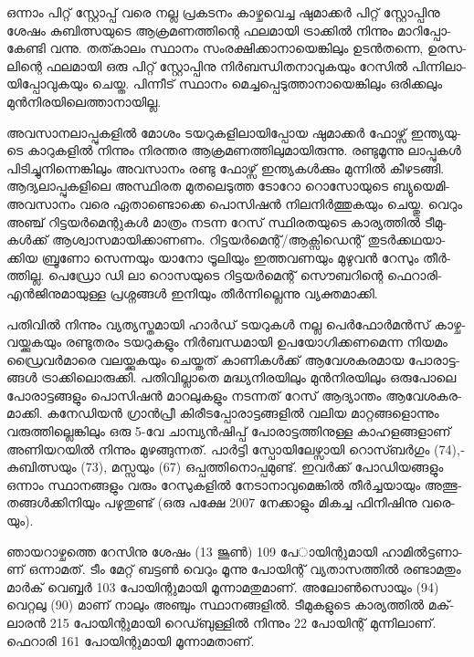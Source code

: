 ഒ­ന്നാം പി­റ്റ് സ്റ്റോ­പ്പ് വരെ നല്ല പ്ര­ക­ട­നം കാ­ഴ്ച­വെ­ച്ച ഷു­മാ­ക്കര്‍ പി­റ്റ് സ്റ്റോ­പ്പി­നു ശേ­ഷം കു­ബി­ത്സ­യു­ടെ ആക്ര­മ­ണ­ത്തി­ന്റെ 
ഫല­മാ­യി ട്രാ­ക്കില്‍ നി­ന്നും മാ­റി­പ്പോ­കേ­ണ്ടി വന്നു. തത്കാ­ലം സ്ഥാ­നം സം­ര­ക്ഷി­ക്കാ­നാ­യെ­ങ്കി­ലും ഉടന്‍­ത­ന്നെ, 
ഉര­സ­ലി­ന്റെ ഫല­മാ­യി ഒരു പി­റ്റ് സ്റ്റോ­പ്പി­നു നിര്‍­ബ­ന്ധി­ത­നാ­വു­ക­യും റേ­സില്‍ പി­ന്നി­ലാ­യി­പ്പോ­വു­ക­യും ചെ­യ്ത. പി­ന്നീ­ട് 
സ്ഥാ­നം മെ­ച്ച­പ്പെ­ടു­ത്താ­നാ­യെ­ങ്കി­ലും ഒരി­ക്ക­ലും മുന്‍­നി­ര­യി­ലെ­ത്താ­നാ­യി­ല്ല.

അ­വ­സാ­ന­ലാ­പ്പു­ക­ളില്‍ മോ­ശം ടയ­റു­ക­ളി­ലാ­യി­പ്പോയ ഷു­മാ­ക്കര്‍ ഫോ­ഴ്സ് ഇന്ത്യ­യു­ടെ കാ­റു­ക­ളില്‍ നി­ന്നും നി­ര­ന്തര 
ആക്ര­മ­ണ­ത്തി­ലു­മാ­യി­രു­ന്നു. രണ്ടു­മൂ­ന്നു ലാ­പ്പു­കള്‍ പി­ടി­ച്ചു­നി­ന്നെ­ങ്കി­ലും അവ­സാ­നം രണ്ടു ഫോ­ഴ്സ് ഇന്ത്യ­കള്‍­ക്കും മു­ന്നില്‍ 
കീ­ഴ­ട­ങ്ങി. ആദ്യ­ലാ­പ്പു­ക­ളി­ലെ അസ്ഥി­രത മു­ത­ലെ­ടു­ത്ത ടോ­റോ റൊ­സോ­യു­ടെ ­ബ്യു­യെ­മി­ അവ­സാ­നം വരെ 
ഏതാ­ണ്ടൊ­ക്കെ പൊ­സി­ഷന്‍ നി­ല­നിര്‍­ത്തു­ക­യും ചെ­യ്തു. വെ­റും അഞ്ച് റി­ട്ട­യര്‍­മെ­ന്റു­കള്‍ മാ­ത്രം നട­ന്ന റേ­സ് 
സ്ഥി­ര­ത­യു­ടെ കാ­ര്യ­ത്തില്‍ ടീ­മു­കള്‍­ക്ക് ആശ്വാ­സ­മാ­യി­ക്കാ­ണ­ണം. റി­ട്ട­യര്‍­മെ­ന്റ്/ആ­ക്സി­ഡെ­ന്റ് തു­ടര്‍­ക്ക­ഥ­യാ­ക്കിയ 
ബ്രൂ­ണോ സെ­ന്ന­യും യാ­നോ ട്രൂ­ലി­യും ഇത്ത­വ­ണ­യും മു­ഴു­വന്‍ റേ­സും തീര്‍­ത്തി­ല്ല. പെ­ഡ്രോ ഡി ലാ റൊ­സ­യു­ടെ 
റി­ട്ട­യര്‍­മെ­ന്റ് സൌ­ബ­റി­ന്റെ ­ഫെ­റാ­രി­ എന്‍­ജി­നു­മാ­യു­ള്ള പ്ര­ശ്ന­ങ്ങള്‍ ഇനി­യും തീര്‍­ന്നി­ല്ലെ­ന്നു വ്യ­ക്ത­മാ­ക്കി­.

­പ­തി­വില്‍ നി­ന്നും വ്യ­ത്യ­സ്ത­മാ­യി ഹാര്‍­ഡ് ടയ­റു­കള്‍ നല്ല പെര്‍­ഫോര്‍­മന്‍­സ് കാ­ഴ്ച­വ­യ്ക്കു­ക­യും രണ്ടു­ത­രം ടയ­റു­ക­ളും 
നിര്‍­ബ­ന്ധ­മാ­യി ഉപ­യോ­ഗി­ക്ക­ണ­മെ­ന്ന നി­യ­മം ഡ്രൈ­വര്‍­മാ­രെ വല­യ്ക്കു­ക­യും ചെ­യ്ത­ത് കാ­ണി­കള്‍­ക്ക് ആവേ­ശ­ക­ര­മായ 
പോ­രാ­ട്ട­ങ്ങള്‍ ട്രാ­ക്കി­ലൊ­രു­ക്കി. പതി­വി­ല്ലാ­തെ മദ്ധ്യ­നി­ര­യി­ലും മുന്‍­നി­ര­യി­ലും ഒരു­പോ­ലെ പോ­രാ­ട്ട­ങ്ങ­ളും പൊ­സി­ഷന്‍ 
മാ­റ­ലു­ക­ളും നട­ന്ന­ത് റേ­സ് ആദ്യാ­ന്തം ആവേ­ശ­ക­ര­മാ­ക്കി. ­ക­നേ­ഡി­യന്‍ ഗ്രാന്‍­പ്രീ­ കി­രീ­ട­പ്പോ­രാ­ട്ട­ങ്ങ­ളില്‍ വലിയ 
മാ­റ്റ­ങ്ങ­ളൊ­ന്നും വരു­ത്തി­ല്ലെ­ങ്കി­ലും ഒരു 5-വേ ചാ­മ്പ്യന്‍­ഷി­പ്പ് പോ­രാ­ട്ട­ത്തി­നു­ള്ള കാ­ഹ­ള­ങ്ങ­ളാ­ണ് അണി­യ­റ­യില്‍ നി­ന്നും 
മു­ഴ­ങ്ങു­ന്ന­ത്. പാര്‍­ട്ടി സ്പോ­യി­ലേ­ഴ്സാ­യി റൊ­സ്ബര്‍­ഗും ­(74),­ കു­ബി­ത്സ­യും ­(73),­ മ­സ്സ­യും ­(67) ഒപ്പ­ത്തി­നൊ­പ്പ­മു­ണ്ട്. 
ഇവര്‍­ക്ക് പോ­ഡി­യ­ങ്ങ­ളും ഒന്നാം സ്ഥാ­ന­ങ്ങ­ളും വരും റേ­സു­ക­ളില്‍ നേ­ടാ­നാ­വു­മെ­ങ്കില്‍ തീര്‍­ച്ച­യാ­യും അത്ഭു­ത­ങ്ങള്‍­ക്കി­നി­യും
പഴു­തു­ണ്ട് (ഒ­രു പക്ഷേ 2007 നേ­ക്കാ­ളും മി­ക­ച്ച ഫി­നി­ഷി­നു വരെ­യും­).

­ഞാ­യ­റാ­ഴ്ച­ത്തെ റേ­സി­നു ശേ­ഷം ­(13 ജൂണ്‍) 109 പേ­ാ­യി­ന്റു­മാ­യി ഹാ­മില്‍­ട്ട­ണാ­ണ് ഒന്നാ­മ­ത്. ടീം മേ­റ്റ് ബട്ടണ്‍ വെ­റും 
മൂ­ന്നു പോ­യി­ന്റ് വ്യ­താ­സ­ത്തില്‍ രണ്ടാ­മ­തും മാര്‍­ക് വെ­ബ്ബര്‍ 103 പോ­യി­ന്റു­മാ­യി മൂ­ന്നാ­മ­തു­മാ­ണ്. അലോണ്‍­സൊ­യും (94) വെ­റ്റ­ലു ­(90)­ മാ­ണ് നാ­ലും അഞ്ചും സ്ഥാ­ന­ങ്ങ­ളില്‍. ടീ­മു­ക­ളു­ടെ കാ­ര്യ­ത്തില്‍ മക്‌­ലാ­രന്‍ 215 പോ­യി­ന്റു­മാ­യി 
റെ­ഡ്ബു­ള്ളില്‍ നി­ന്നും 22 പോ­യി­ന്റ് മു­ന്നി­ലാ­ണ്. ഫെ­റാ­രി 161 പോ­യി­ന്റു­മാ­യി മൂ­ന്നാ­മ­താ­ണ്.


